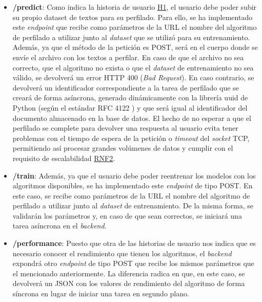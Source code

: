 \begin{itemize}
	\item \textbf{/predict}: Como indica la historia de usuario \hyperref[req:hu1]{H1}, el usuario
	      debe poder subir su propio dataset de textos para su perfilado. Para ello, se ha implementado este \textit{endpoint} que recibe como parámetros de la URL el
	      nombre del algoritmo de perfilado a utilizar junto al \textit{dataset} que se utilizó para su entrenamiento. Además, ya que el método de la petición es POST,
	      será en el cuerpo donde se envíe
	      el archivo con los textos a perfilar. En caso de que el archivo no sea correcto, que el algoritmo no exista o que el \textit{dataset} de entrenamiento
	      no sea válido, se devolverá un error HTTP 400 (\textit{Bad Request}). En caso contrario, se devolverá un identificador correspondiente a la tarea de perfilado
	      que se creará de forma asíncrona, generado dinámicamente con la librería uuid \cite{uuidpython} de Python (según el estándar RFC 4122 \cite{rfc4122}) y que será igual
	      al identificador del documento almacenado en la base de datos.
	      El hecho de no esperar a que el perfilado se complete
	      para devolver una respuesta al usuario evita tener problemas con el tiempo de espera de la petición o \textit{timeout} del \textit{socket} TCP,
	      permitiendo así procesar grandes volúmenes de datos y cumplir con el requisito de escalabilidad \hyperref[req:rnf2]{RNF2}.

	\item \textbf{/train}: Además, ya que el usuario debe poder reentrenar los modelos con los algoritmos disponibles, se ha implementado este \textit{endpoint} de tipo POST.
	      En este caso, se recibe como parámetros de la URL el nombre del algoritmo de perfilado a utilizar junto al \textit{dataset} de entrenamiento. De la misma forma,
	      se validarán los parámetros y, en caso de que sean correctos, se iniciará una tarea asíncrona en el \textit{backend}.

	\item \textbf{/performance}: Puesto que otra de las historias de usuario nos indica que es necesario conocer el rendimiento que tienen los algoritmos,
	      el \textit{backend} expondrá otro \textit{endpoint} de tipo POST que recibe los mismos parámetros que el mencionado anteriormente. La diferencia radica en que, en este caso,
	      se devolverá un JSON con los valores de rendimiento del algoritmo de forma síncrona en lugar de iniciar una tarea en segundo plano.


\end{itemize}
